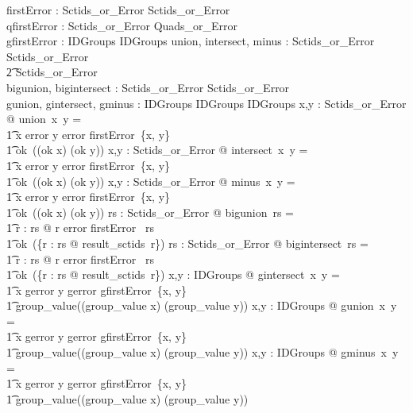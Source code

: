 \documentclass{article}
\begin{document}
\begin{gendef}
   firstError : \power Sctids\_or\_Error \fun Sctids\_or\_Error \\
   qfirstError : \power Sctids\_or\_Error \fun Quads\_or\_Error  \\
   gfirstError : \power IDGroups \fun IDGroups
\also
   union, intersect, minus : Sctids\_or\_Error \fun Sctids\_or\_Error \fun \\
\t2 Sctids\_or\_Error \\
   bigunion, bigintersect : \power Sctids\_or\_Error \fun Sctids\_or\_Error \\
\also
   gunion, gintersect, gminus : IDGroups \fun IDGroups \fun IDGroups
\where
   \forall x,y : Sctids\_or\_Error @ union~x~y = \\
\t1 \IF x \in \ran error \lor  y \in \ran error \THEN firstError~\{x, y\} \\
\t1 \ELSE ok~((ok \inv x) \cup (ok \inv y))
\also
   \forall x,y : Sctids\_or\_Error @ intersect~x~y = \\
\t1 \IF x \in \ran error \lor y \in \ran error \THEN firstError~\{x, y\} \\
\t1 \ELSE ok~((ok \inv x) \cap (ok \inv y))
\also
   \forall x,y : Sctids\_or\_Error @ minus~x~y = \\
\t1 \IF x \in \ran error \lor y \in \ran error \THEN firstError~\{x, y\} \\
\t1 \ELSE ok~((ok \inv x) \setminus (ok \inv y))
\also
  \forall rs : \power Sctids\_or\_Error @ bigunion~rs = \\
\t1 \IF \exists r : rs @ r \in \ran error \THEN firstError~ rs \\
\t1 \ELSE ok~(\bigcup \{r : rs @ result\_sctids~r\})
\also
  \forall rs : \power Sctids\_or\_Error @ bigintersect~rs = \\
\t1 \IF \exists r : rs @ r \in \ran error \THEN firstError~ rs \\
\t1 \ELSE ok~(\bigcap \{r : rs @ result\_sctids~r\})
\also
   \forall x,y : IDGroups @ gintersect~x~y = \\
\t1 \IF x \in \ran gerror \lor y \in \ran gerror \THEN gfirstError~\{x, y\} \\
\t1 \ELSE group\_value((group\_value \inv x) \cap (group\_value \inv y))
\also
\forall x,y : IDGroups @ gunion~x~y = \\
\t1 \IF x \in \ran gerror \lor y \in \ran gerror \THEN gfirstError~\{x, y\} \\
\t1 \ELSE group\_value((group\_value \inv x) \cup (group\_value \inv y))
\also
\forall x,y : IDGroups @ gminus~x~y = \\
\t1 \IF x \in \ran gerror \lor y \in \ran gerror \THEN gfirstError~\{x, y\} \\
\t1 \ELSE group\_value((group\_value \inv x) \setminus (group\_value \inv y))
\end{gendef}
\end{document}
